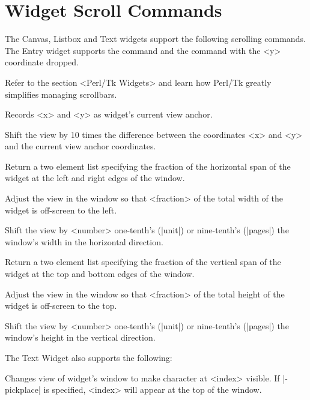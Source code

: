 \section{Widget Scroll Commands}

The Canvas, Listbox and Text widgets support the following scrolling commands.
The Entry widget supports the  command and the  command 
with the <y> coordinate dropped.

Refer to the section <Perl/Tk Widgets> and learn how
Perl/Tk greatly simplifies managing scrollbars.

\begin{enum}{1cm}

Records <x> and <y> as widget's current view anchor.

Shift the view by 10 times the difference between the coordinates <x>
and <y> and the current view anchor coordinates.

Return a two element list specifying the fraction of the horizontal span
of the widget at the left and right edges of the window.

Adjust the view in the window so that <fraction> of the total width
of the widget is off-screen to the left.

Shift the view by <number> one-tenth's (|unit|) or nine-tenth's (|pages|)
the window's width in the horizontal direction. 

Return a two element list specifying the fraction of the vertical span
of the widget at the top and bottom edges of the window.

Adjust the view in the window so that <fraction> of the total height
of the widget is off-screen to the top.

Shift the view by <number> one-tenth's (|unit|) or nine-tenth's (|pages|)
the window's height in the vertical direction. 

\end{enum}

\vskip5pt
The Text Widget also supports the following:

\begin{enum}{1cm}

Changes view of widget's window to make character at <index> visible. 
If |-pickplace| is specified, <index> will appear at the top of the window.

\end{enum}

